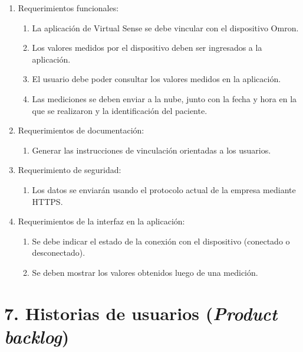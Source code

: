 \documentclass[
11pt, %
]{charter}
\begin{document}
\begin{enumerate}
	\item Requerimientos funcionales:
		\begin{enumerate}
			\item La aplicación de Virtual Sense se debe vincular con el dispositivo Omron.
			\item Los valores medidos por el dispositivo deben ser ingresados a la aplicación.
			\item El usuario debe poder consultar los valores medidos en la aplicación.
			\item Las mediciones se deben enviar a la nube, junto con la fecha y hora en la que se realizaron y la identificación del paciente.
		\end{enumerate}
	\item Requerimientos de documentación:
		\begin{enumerate}
			\item Generar las instrucciones de vinculación orientadas a los usuarios.
		\end{enumerate}
	\item Requerimiento de seguridad:
		\begin{enumerate}
			\item Los datos se enviarán usando el protocolo actual de la empresa mediante HTTPS.
		\end{enumerate}
	\item Requerimientos de la interfaz en la aplicación:
		\begin{enumerate}
			\item Se debe indicar el estado de la conexión con el dispositivo (conectado o desconectado).
			\item Se deben mostrar los valores obtenidos luego de una medición.
		\end{enumerate}
\end{enumerate}

\section{7. Historias de usuarios (\textit{Product backlog})}
\label{sec:backlog}
\end{document}
